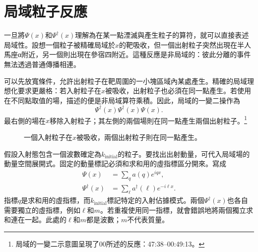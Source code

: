 \begin{classroomqa}
\end{classroomqa}

\section{局域粒子反應}

一旦將\(\Psi(x)\)和\(\Psi^\dagger(x)\)理解為在某一點湮滅與產生粒子的算符，就可以直接表述局域性。設想一個粒子被精確局域於\(x\)的靶吸收，但一個出射粒子突然出現在半人馬座{\proseunicodefont α}附近，另一個則出現在參宿四附近。這種反應是非局域的：彼此分離的事件無法透過普通傳播相連。

可以先放寬條件，允許出射粒子在靶周圍的一小塊區域內某處產生。精確的局域理想化要求更嚴格：若入射粒子在\(x\)被吸收，出射粒子也必須在同一點產生。若使用在不同點取值的場，描述的便是非局域算符乘積。因此，局域的一變二操作為
\begin{equation}
\Psi^\dagger(x)\Psi^\dagger(x)\Psi(x).
\end{equation}
最右側的場在\(x\)移除入射粒子；其左側的兩個場則在同一點產生兩個出射粒子。\footnote{局域的一變二示意圖呈現了00所述的反應：47:38--00:49:13。}

\begin{figure}[t]
\centering
{}
\caption{一個入射粒子在\(x\)被吸收，兩個出射粒子則在同一點產生。}
\end{figure}

假設入射態包含一個波數確定為\(k_{\mathrm{initial}}\)的粒子。要找出出射動量，可代入局域場的動量空間展開式。固定的動量標記必須和求和用的虛指標區分開來。寫成
\begin{align}
\Psi(x)&=\sum_q a(q)e^{iqx},\\
\Psi^\dagger(x)&=\sum_\ell a^\dagger(\ell)e^{-i\ell x}.
\end{align}
指標\(q\)是求和用的虛指標，而\(k_{\mathrm{initial}}\)標記特定的入射佔據模式。兩個\(\Psi^\dagger(x)\)也各自需要獨立的虛指標，例如\(\ell\)和\(m\)。若重複使用同一指標，就會錯誤地將兩個獨立求和連在一起。此處的\(\ell\)和\(m\)都是波數；\(m\)不代表質量。

